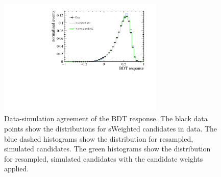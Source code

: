 \begin{figure}[!tb]
 \centering
 \includegraphics[width=0.7\textwidth]{figs/kpimm/data-mc/reweighting/BDT.pdf}
 
 \caption{Data-simulation agreement of the BDT response. The black data points show the distributions for sWeighted \BdToJPsiKst candidates in data. The blue dashed histograms show the distribution for resampled, simulated \BdToJPsiKst candidates. The green histograms show the distribution for resampled, simulated \BdToJPsiKst candidates with the candidate weights applied.}
\label{fig:data-mc:bdt}
\end{figure}